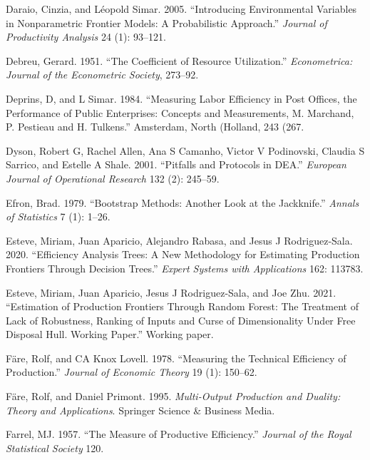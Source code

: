 \begin{CSLReferences}{1}{0}
\leavevmode{}%
Daraio, Cinzia, and Léopold Simar. 2005. {``Introducing Environmental Variables in Nonparametric Frontier Models: A Probabilistic Approach.''} \emph{Journal of Productivity Analysis} 24 (1): 93--121.

\leavevmode{}%
Debreu, Gerard. 1951. {``The Coefficient of Resource Utilization.''} \emph{Econometrica: Journal of the Econometric Society}, 273--92.

\leavevmode{}%
Deprins, D, and L Simar. 1984. {``Measuring Labor Efficiency in Post Offices, the Performance of Public Enterprises: Concepts and Measurements, {M. Marchand, P. Pestieau and H. Tulkens}.''} Amsterdam, North (Holland, 243 (267.

\leavevmode{}%
Dyson, Robert G, Rachel Allen, Ana S Camanho, Victor V Podinovski, Claudia S Sarrico, and Estelle A Shale. 2001. {``Pitfalls and Protocols in DEA.''} \emph{European Journal of Operational Research} 132 (2): 245--59.

\leavevmode{}%
Efron, Brad. 1979. {``Bootstrap Methods: Another Look at the Jackknife.''} \emph{Annals of Statistics} 7 (1): 1--26.

\leavevmode{}%
Esteve, Miriam, Juan Aparicio, Alejandro Rabasa, and Jesus J Rodriguez-Sala. 2020. {``Efficiency Analysis Trees: A New Methodology for Estimating Production Frontiers Through Decision Trees.''} \emph{Expert Systems with Applications} 162: 113783.

\leavevmode{}%
Esteve, Miriam, Juan Aparicio, Jesus J Rodriguez-Sala, and Joe Zhu. 2021. {``Estimation of Production Frontiers Through Random Forest: The Treatment of Lack of Robustness, Ranking of Inputs and Curse of Dimensionality Under Free Disposal Hull. Working Paper.''} Working paper.

\leavevmode{}%
Färe, Rolf, and CA Knox Lovell. 1978. {``Measuring the Technical Efficiency of Production.''} \emph{Journal of Economic Theory} 19 (1): 150--62.

\leavevmode{}%
Färe, Rolf, and Daniel Primont. 1995. \emph{Multi-Output Production and Duality: Theory and Applications}. Springer Science \& Business Media.

\leavevmode{}%
Farrel, MJ. 1957. {``The Measure of Productive Efficiency.''} \emph{Journal of the Royal Statistical Society} 120.


\end{CSLReferences}
